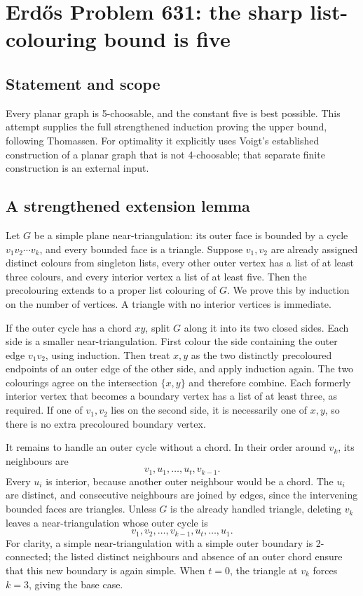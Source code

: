\section{Erd\H{o}s Problem 631: the sharp list-colouring bound is five}
\subsection*{Statement and scope}
Every planar graph is 5-choosable, and the constant five is best possible. This attempt supplies the full strengthened induction proving the upper bound, following Thomassen. For optimality it explicitly uses Voigt's established construction of a planar graph that is not 4-choosable; that separate finite construction is an external input.

\subsection*{A strengthened extension lemma}
Let $G$ be a simple plane near-triangulation: its outer face is bounded by a cycle $v_1v_2\cdots v_k$, and every bounded face is a triangle. Suppose $v_1,v_2$ are already assigned distinct colours from singleton lists, every other outer vertex has a list of at least three colours, and every interior vertex a list of at least five. Then the precolouring extends to a proper list colouring of $G$.
We prove this by induction on the number of vertices. A triangle with no interior vertices is immediate.

If the outer cycle has a chord $xy$, split $G$ along it into its two closed sides. Each side is a smaller near-triangulation. First colour the side containing the outer edge $v_1v_2$, using induction. Then treat $x,y$ as the two distinctly precoloured endpoints of an outer edge of the other side, and apply induction again. The two colourings agree on the intersection $\{x,y\}$ and therefore combine. Each formerly interior vertex that becomes a boundary vertex has a list of at least three, as required. If one of $v_1,v_2$ lies on the second side, it is necessarily one of $x,y$, so there is no extra precoloured boundary vertex.

It remains to handle an outer cycle without a chord. In their order around $v_k$, its neighbours are
\[
 v_1,u_1,\ldots,u_t,v_{k-1}.
\]
Every $u_i$ is interior, because another outer neighbour would be a chord. The $u_i$ are distinct, and consecutive neighbours are joined by edges, since the intervening bounded faces are triangles. Unless $G$ is the already handled triangle, deleting $v_k$ leaves a near-triangulation whose outer cycle is
\[
 v_1,v_2,\ldots,v_{k-1},u_t,\ldots,u_1.
\]
For clarity, a simple near-triangulation with a simple outer boundary is 2-connected; the listed distinct neighbours and absence of an outer chord ensure that this new boundary is again simple. When $t=0$, the triangle at $v_k$ forces $k=3$, giving the base case.

